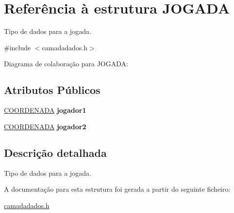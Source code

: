 \hypertarget{structJOGADA}{}\section{Referência à estrutura J\+O\+G\+A\+DA}
\label{structJOGADA}


Tipo de dados para a jogada.  




{\ttfamily \#include $<$camadadados.\+h$>$}



Diagrama de colaboração para J\+O\+G\+A\+DA\+:
\subsection*{Atributos Públicos}
\begin{DoxyCompactItemize}
\item 
\mbox{\label{structJOGADA_a93d9306cb0c49b66b7d9a615bffe0149}} 
\hyperlink{structCOORDENADA}{C\+O\+O\+R\+D\+E\+N\+A\+DA} {\bfseries jogador1}
\item 
\mbox{\label{structJOGADA_ab46b16dfbdc7f2af9430c8dcdac0914b}} 
\hyperlink{structCOORDENADA}{C\+O\+O\+R\+D\+E\+N\+A\+DA} {\bfseries jogador2}
\end{DoxyCompactItemize}


\subsection{Descrição detalhada}
Tipo de dados para a jogada. 

A documentação para esta estrutura foi gerada a partir do seguinte ficheiro\+:\begin{DoxyCompactItemize}
\item 
\hyperlink{camadadados_8h}{camadadados.\+h}\end{DoxyCompactItemize}

